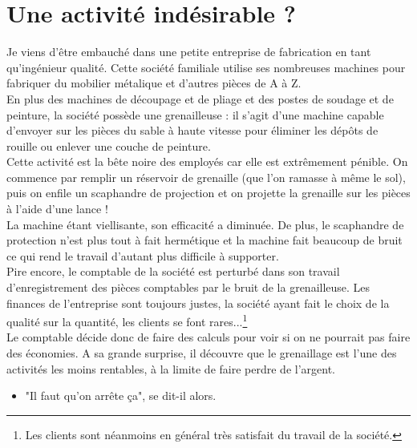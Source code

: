 
\chapter{Une activité indésirable ?}


Je viens d'être embauché dans une petite entreprise de 
fabrication en tant qu'ingénieur qualité. Cette société 
familiale utilise ses nombreuses machines pour fabriquer 
du mobilier métalique et d'autres pièces de A à Z. \\
\hspace*{\parindent}En plus des machines de découpage et de pliage et des postes  
de soudage et de peinture, la société possède une grenailleuse :
il s'agit d'une machine capable d'envoyer sur les pièces du 
sable à haute vitesse pour éliminer les dépôts de rouille ou 
enlever une couche de peinture. \\
\hspace*{\parindent}Cette activité est la bête noire des employés car elle est 
extrêmement pénible. On commence par remplir un réservoir de 
grenaille (que l'on ramasse à même le sol), puis on 
enfile un scaphandre de projection et on projette la grenaille 
sur les pièces à l'aide d'une lance ! \\
\hspace*{\parindent}La machine étant viellisante, son efficacité a diminuée. 
De plus, le scaphandre de protection n'est plus tout à fait 
hermétique et la machine fait beaucoup de bruit ce qui rend 
le travail d'autant plus difficile à supporter. \\
\hspace*{\parindent}Pire encore, le comptable de la société est perturbé dans son 
travail d'enregistrement des pièces comptables par le bruit de 
la grenailleuse. Les finances de l'entreprise sont toujours 
justes, la société ayant fait le choix de la qualité sur la 
quantité, les clients se font rares...\footnote{Les clients 
sont néanmoins en général très satisfait du travail de la 
société.} \\ 
\hspace*{\parindent}Le comptable décide donc de faire des calculs pour voir si on 
ne pourrait pas faire des économies. A sa grande surprise, il 
découvre que le grenaillage est l'une des activités les moins 
rentables, à la limite de faire perdre de l'argent.
\begin{itemize}
 \item "Il faut qu'on arrête ça", se dit-il alors.
\end{itemize}
